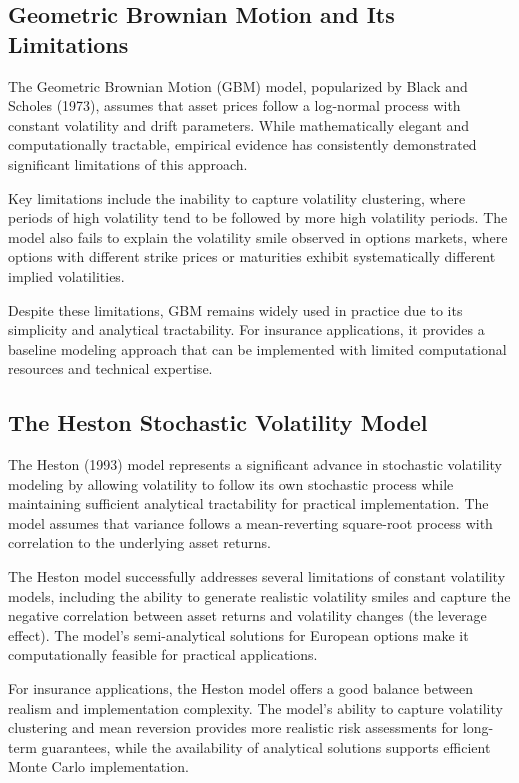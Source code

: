 \documentclass[12pt,a4paper]{report}
\begin{document}
\subsection{Geometric Brownian Motion and Its Limitations}

The Geometric Brownian Motion (GBM) model, popularized by Black and Scholes (1973), assumes that asset prices follow a log-normal process with constant volatility and drift parameters. While mathematically elegant and computationally tractable, empirical evidence has consistently demonstrated significant limitations of this approach.

Key limitations include the inability to capture volatility clustering, where periods of high volatility tend to be followed by more high volatility periods. The model also fails to explain the volatility smile observed in options markets, where options with different strike prices or maturities exhibit systematically different implied volatilities.

Despite these limitations, GBM remains widely used in practice due to its simplicity and analytical tractability. For insurance applications, it provides a baseline modeling approach that can be implemented with limited computational resources and technical expertise.

\subsection{The Heston Stochastic Volatility Model}

The Heston (1993) model represents a significant advance in stochastic volatility modeling by allowing volatility to follow its own stochastic process while maintaining sufficient analytical tractability for practical implementation. The model assumes that variance follows a mean-reverting square-root process with correlation to the underlying asset returns.

The Heston model successfully addresses several limitations of constant volatility models, including the ability to generate realistic volatility smiles and capture the negative correlation between asset returns and volatility changes (the leverage effect). The model's semi-analytical solutions for European options make it computationally feasible for practical applications.

For insurance applications, the Heston model offers a good balance between realism and implementation complexity. The model's ability to capture volatility clustering and mean reversion provides more realistic risk assessments for long-term guarantees, while the availability of analytical solutions supports efficient Monte Carlo implementation.
\end{document}
